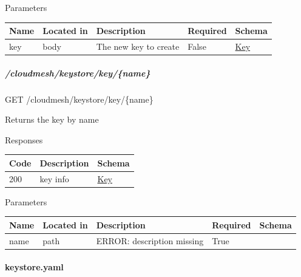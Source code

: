 \documentclass[9pt,]{article}
\let\oldparagraph\paragraph
\renewcommand{\paragraph}[1]{\oldparagraph{#1}\mbox{}}
\let\oldsubparagraph\subparagraph
\renewcommand{\subparagraph}[1]{\oldsubparagraph{#1}\mbox{}}
\begin{document}
Parameters

\begin{longtable}[]{@{}lllll@{}}
\toprule
Name & Located in & Description & Required & Schema\tabularnewline
\midrule
\endhead
key & body & The new key to create & False &
\protect\hyperlink{key}{Key}\tabularnewline
\bottomrule
\end{longtable}

\hypertarget{cloudmeshkeystorekeyname}{%
\subparagraph{/cloudmesh/keystore/key/\{name\}}\label{cloudmeshkeystorekeyname}}

GET /cloudmesh/keystore/key/\{name\}

Returns the key by name

Responses

\begin{longtable}[]{@{}lll@{}}
\toprule
Code & Description & Schema\tabularnewline
\midrule
\endhead
200 & key info & \protect\hyperlink{key}{Key}\tabularnewline
\bottomrule
\end{longtable}

Parameters

\begin{longtable}[]{@{}lllll@{}}
\toprule
Name & Located in & Description & Required & Schema\tabularnewline
\midrule
\endhead
name & path & ERROR: description missing & True &\tabularnewline
\bottomrule
\end{longtable}

\hypertarget{keystore.yaml}{%
\paragraph{keystore.yaml}\label{keystore.yaml}}
\end{document}
